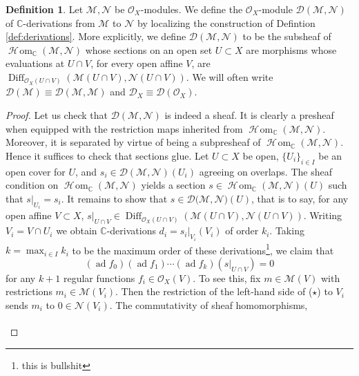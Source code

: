 \documentclass{article}
\newcommand{\C}{\mathbb{C}}
\theoremstyle{plain}
\theoremstyle{definition}
\newtheorem{definition}[theorem]{Definition}
\theoremstyle{remark}
\DeclareMathOperator{\sHom}{\mathscr{H}\!om}
\DeclareMathOperator{\Diff}{Diff}
\DeclareMathOperator{\ad}{ad}
\begin{document}
\begin{definition}
    Let $\mathcal{M},\mathcal{N}$ be $\mathcal{O}_X$-modules. We define the $\mathcal{O}_X$-module $\mathcal{D}(\mathcal{M},\mathcal{N})$ of $\C$-derivations
    from $\mathcal{M}$ to $\mathcal{N}$ by localizing the construction of Defintion \ref{def:derivations}.
    More explicitly, we define $\mathcal{D}(\mathcal{M},\mathcal{N})$ to be the subsheaf of $\sHom_\C(\mathcal{M},\mathcal{N})$
    whose sections on an open set $U\subset X$ are morphisms whose evaluations at $U\cap V$, for every
    open affine $V$, are $\Diff_{\mathcal{O}_X(U\cap V)}(\mathcal{M}(U\cap V),\mathcal{N}(U\cap V))$.
    We will often write $\mathcal{D}(\mathcal{M})\equiv\mathcal{D}(\mathcal{M,M})$ and $\mathcal{D}_X\equiv\mathcal{D}(\mathcal{O}_X)$.
\end{definition}
\begin{proof}
    Let us check that $\mathcal{D}(\mathcal{M},\mathcal{N})$ is indeed a sheaf. It is clearly
    a presheaf when equipped with the restriction maps inherited from $\sHom_\C(\mathcal{M},\mathcal{N})$.
    Moreover, it is separated by virtue of being a subpresheaf of $\sHom_\C(\mathcal{M},\mathcal{N})$.
    Hence it suffices to check that sections glue. Let $U\subset X$ be open, $\{U_i\}_{i\in I}$ be
    an open cover for $U$, and $s_i\in\mathcal{D}(\mathcal{M},\mathcal{N})(U_i)$ agreeing on
    overlaps. The sheaf condition
    on $\sHom_\C(\mathcal{M},\mathcal{N})$ yields a section $s\in\sHom_\C(\mathcal{M},\mathcal{N})(U)$
    such that $s|_{U_i}=s_i$. It remains to show that $s\in\mathcal{D}(\mathcal{M},\mathcal{N)}(U)$, that is
    to say, for any open affine $V\subset X$, $s|_{U\cap V}\in\Diff_{\mathcal{O}_X(U\cap V)}(\mathcal{M}(U\cap V),\mathcal{N}(U\cap V))$.
    Writing $V_i=V\cap U_i$ we obtain $\C$-derivations $d_i=s_i|_{V_i}(V_i)$ of order $k_i$. Taking
    $k=\max_{i\in I} k_i$ to be the maximum order of these derivations\footnote{this is bullshit}, we claim that
    \begin{equation*}
        (\ad f_0)(\ad f_1)\cdots(\ad f_k)(s|_{U\cap V})=0\tag{$\star$}
    \end{equation*}
    for any $k+1$ regular functions $f_i\in\mathcal{O}_X(V)$. To see this, fix $m\in\mathcal{M}(V)$
    with restrictions $m_i\in\mathcal{M}(V_i)$. Then the restriction of the left-hand side of ($\star$)
    to $V_i$ sends $m_i$ to $0\in\mathcal{N}(V_i)$. The commutativity of sheaf homomorphisms,
    \begin{equation*}
        \begin{tikzcd}

\end{tikzcd}
\end{equation*}
\end{proof}
\end{document}
